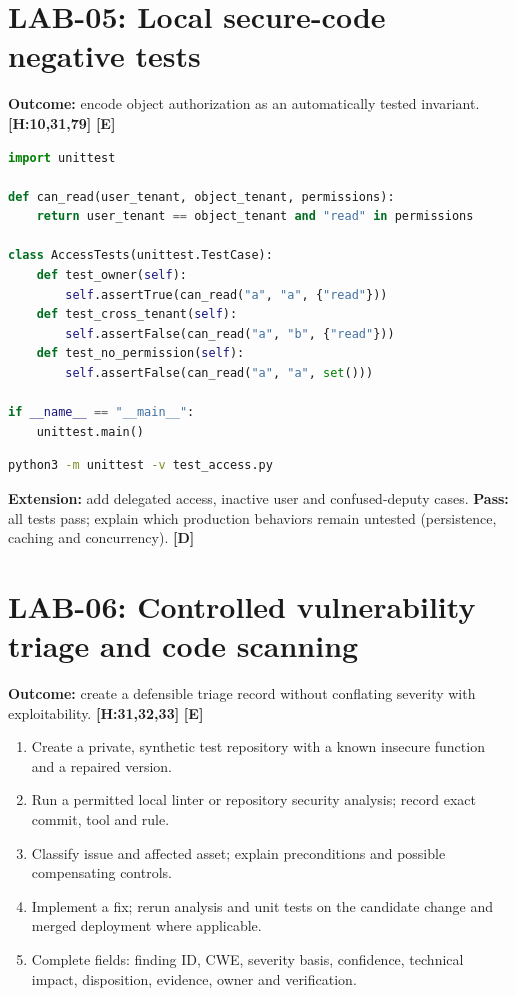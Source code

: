 \documentclass[10pt,letterpaper,oneside]{article}
\newcommand{\handbookref}[1]{\textsf{\color{accent}\textbf{[H:#1]}}}
\newcommand{\modernext}{\textsf{\color{muted}\textbf{[E]}}}
\newcommand{\designed}{\textsf{\color{accent}\textbf{[D]}}}
\begin{document}
\section{LAB-05: Local secure-code negative tests}
\textbf{Outcome:} encode object authorization as an automatically tested invariant. \handbookref{10,31,79} \modernext{}
\begin{lstlisting}[language=Python,caption={Save as test\_access.py; stdlib unittest}]
import unittest

def can_read(user_tenant, object_tenant, permissions):
    return user_tenant == object_tenant and "read" in permissions

class AccessTests(unittest.TestCase):
    def test_owner(self):
        self.assertTrue(can_read("a", "a", {"read"}))
    def test_cross_tenant(self):
        self.assertFalse(can_read("a", "b", {"read"}))
    def test_no_permission(self):
        self.assertFalse(can_read("a", "a", set()))

if __name__ == "__main__":
    unittest.main()
\end{lstlisting}
\begin{lstlisting}[language=bash,caption={Run tests and preserve exit status}]
python3 -m unittest -v test_access.py
\end{lstlisting}
\textbf{Extension:} add delegated access, inactive user and confused-deputy cases. \textbf{Pass:} all tests pass; explain which production behaviors remain untested (persistence, caching and concurrency). \designed{}

\section{LAB-06: Controlled vulnerability triage and code scanning}
\textbf{Outcome:} create a defensible triage record without conflating severity with exploitability. \handbookref{31,32,33} \modernext{}
\begin{enumerate}
\item Create a private, synthetic test repository with a known insecure function and a repaired version.
\item Run a permitted local linter or repository security analysis; record exact commit, tool and rule.
\item Classify issue and affected asset; explain preconditions and possible compensating controls.
\item Implement a fix; rerun analysis and unit tests on the candidate change and merged deployment where applicable.
\item Complete fields: finding ID, CWE, severity basis, confidence, technical impact, disposition, evidence, owner and verification.
\end{enumerate}
\end{document}
